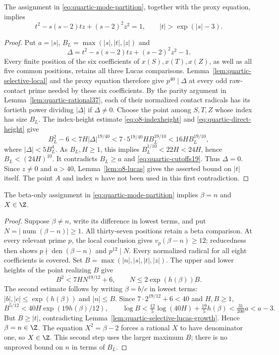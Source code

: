 \begin{lemma}
\label{lem:quartic-selective-lucas-growth}
The assignment in \eqref{eq:quartic-mode-partition}, together with
the proxy equation, implies
\[
 t^2-s(s-2)tz+(s-2)^2z^2=1,
 \qquad |t|>\exp(|s|-3).
\]
\end{lemma}
\begin{proof}
Put $a=|s|$, $B_L=\max(|s|,|t|,|z|)$ and
\[
 \Delta=t^2-s(s-2)tz+(s-2)^2z^2-1.
\]
Every finite position of the six coefficients of $x(S),x(T),x(Z)$,
as well as all five common positions, retains all three Lucas
comparisons. Lemma~\ref{lem:quartic-selective-local}
and the proxy equation therefore give $p^{40}\mid\Delta$ at every
odd raw-contact prime needed by these six coefficients. By the parity
argument in Lemma~\ref{lem:quartic-rational37}, each of their normalized
contact radicals has its fortieth power dividing $|\Delta|$ if
$\Delta\ne0$. Choose the point among $S,T,Z$ whose index has size $B_L$.
The index-height estimate \eqref{eq:o8-indexheight} and
\eqref{eq:quartic-direct-height} give
\[
 B_L^2-6<7H|\Delta|^{19/40}
       <7\cdot5^{19/40}HB_L^{19/10}<16HB_L^{19/10},
\]
where $|\Delta|<5B_L^4$. As $B_L,H\ge1$, this implies
$B_L^{1/10}<22H<24H$, hence $B_L<(24H)^{10}$.
It contradicts $B_L\ge a$ and \eqref{eq:quartic-cutoffs19}.
Thus $\Delta=0$. Since $z\ne0$ and $a>40$, Lemma~\ref{lem:o8-lucas}
gives the asserted bound on $|t|$ itself. The point $A$ and index $n$
have not been used in this first contradiction.
\end{proof}

\begin{lemma}
\label{lem:quartic-beta-only}
The beta-only assignment in \eqref{eq:quartic-mode-partition} implies
$\beta=n$ and $X\in\Z$.
\end{lemma}
\begin{proof}
Suppose $\beta\ne n$, write its difference in lowest terms, and put
$N=|\operatorname{num}(\beta-n)|\ge1$.
All thirty-seven positions retain a beta comparison. At every relevant
prime $p$, the local conclusion gives $v_p(\beta-n)\ge12$; reducedness
then shows $p\nmid\operatorname{den}(\beta-n)$ and $p^{12}\mid N$.
Every normalized radical for all eight coefficients is covered.
Set $B=\max(|n|,|s|,|t|,|z|)$. The upper and lower heights of the point
realizing $B$ give
\[
 B^2<7HN^{19/12}+6,
 \qquad N\le2\exp(h(\beta))B.
\]
The second estimate follows by writing $\beta=b/c$ in lowest terms:
$|b|,|c|\le\exp(h(\beta))$ and $|n|\le B$.
Since $7\cdot2^{19/12}+6<40$ and $H,B\ge1$,
\[
 B^{5/12}<40H\exp(19h(\beta)/12),
 \qquad
 \log B<\tfrac{12}{5}\log(40H)+\tfrac{19}{5}h(\beta)
         <\tfrac{31}{200}a<a-3.
\]
But $B\ge|t|$, contradicting
Lemma~\ref{lem:quartic-selective-lucas-growth}. Hence $\beta=n\in\Z$.
The equation $X^2=\beta-2$ forces a rational $X$ to have denominator
one, so $X\in\Z$. This second step uses the larger maximum $B$;
there is no unproved bound on $n$ in terms of $B_L$.
\end{proof}

